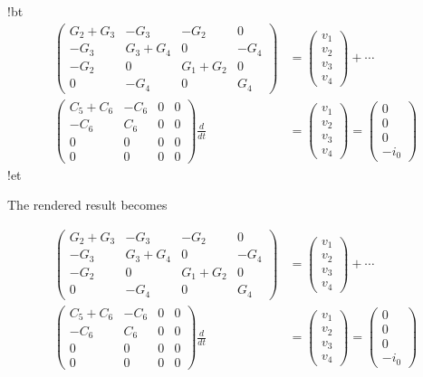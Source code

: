 \documentclass[%
oneside,                 %
final,                   %
10pt]{article}
\begin{document}
\blatexcod
!bt
\begin{align*}
\begin{pmatrix}
G_2 + G_3 & -G_3 & -G_2 & 0 \\ 
-G_3 & G_3 + G_4 & 0 & -G_4 \\ 
-G_2 & 0 & G_1 + G_2 & 0 \\ 
0 & -G_4 & 0 & G_4
\end{pmatrix}
&=
\begin{pmatrix}
v_1 \\ 
v_2 \\ 
v_3 \\ 
v_4
\end{pmatrix}
+ \cdots \\ 
\begin{pmatrix}
C_5 + C_6 & -C_6 & 0 & 0 \\ 
-C_6 & C_6 & 0 & 0 \\ 
0 & 0 & 0 & 0 \\ 
0 & 0 & 0 & 0
\end{pmatrix}
\frac{d}{dt} &=
\begin{pmatrix}
v_1 \\ 
v_2 \\ 
v_3 \\ 
v_4
\end{pmatrix} =
\begin{pmatrix}
0 \\ 
0 \\ 
0 \\ 
-i_0
\end{pmatrix}
\end{align*}
!et
\elatexcod

The rendered result becomes

\begin{align*}
\begin{pmatrix}
G_2 + G_3 & -G_3 & -G_2 & 0 \\ 
-G_3 & G_3 + G_4 & 0 & -G_4 \\ 
-G_2 & 0 & G_1 + G_2 & 0 \\ 
0 & -G_4 & 0 & G_4
\end{pmatrix}
&=
\begin{pmatrix}
v_1 \\ 
v_2 \\ 
v_3 \\ 
v_4
\end{pmatrix}
+ \cdots \\ 
\begin{pmatrix}
C_5 + C_6 & -C_6 & 0 & 0 \\ 
-C_6 & C_6 & 0 & 0 \\ 
0 & 0 & 0 & 0 \\ 
0 & 0 & 0 & 0
\end{pmatrix}
\frac{d}{dt} &=
\begin{pmatrix}
v_1 \\ 
v_2 \\ 
v_3 \\ 
v_4
\end{pmatrix} =
\begin{pmatrix}
0 \\ 
0 \\ 
0 \\ 
-i_0
\end{pmatrix}
\end{align*}


\end{document}
